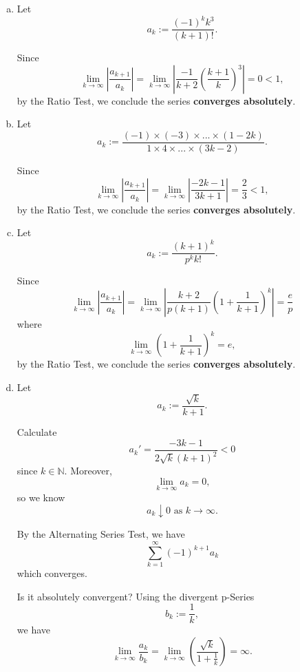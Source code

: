 \begin{Exercise}
\begin{enumerate}[a)]
\item
\begin{solution}
Let 
$$
a_k := \frac{(-1)^k k^3}{(k+1)!}.
$$

Since 
$$
\lim_{k\to\infty}\left|\frac{a_{k+1}}{a_k}\right| 
= \lim_{k\to\infty}\left|\frac{-1}{k+2}\left(\frac{k+1}{k}\right)^3\right| 
= 0 
< 1,
$$ by the Ratio Test, we conclude the series \textbf{converges absolutely}.
\end{solution}

\item
\begin{solution}
Let 
$$a_k := \frac{(-1)\times(-3)\times...\times(1-2k)}{1 \times 4 \times ... \times (3k-2)}.
$$

Since 
$$
\lim_{k\to\infty}\left|\frac{a_{k+1}}{a_k}\right| 
= \lim_{k\to\infty}\left|\frac{-2k-1}{3k+1}\right| 
= \frac{2}{3} 
< 1,
$$ by the Ratio Test, we conclude the series \textbf{converges absolutely}.
\end{solution}

\item
\begin{solution}
Let 
$$
a_k := \frac{\left( k+1 \right)^k}{p^k k!}.
$$

Since 
$$
\lim_{k\to\infty}\left|\frac{a_{k+1}}{a_k}\right| 
= \lim_{k\to\infty}\left|\frac{k+2}{p\left(k+1\right)}\left(1+\frac{1}{k+1}\right)^k\right| 
= \frac{e}{p}
$$ 
where 
$$
\lim_{k\to\infty}\left(1+\frac{1}{k+1}\right)^k = e,
$$
by the Ratio Test, we conclude the series \textbf{converges absolutely}.
\end{solution}

\item
\begin{solution}
Let
$$
a_k := \frac{\sqrt{k}}{k+1}.
$$

Calculate 
$$
a_k' = \frac{-3k-1}{2\sqrt{k}\left(k+1\right)^2} < 0
$$ 
since $k\in\mathbb{N}$. Moreover, 
$$
\lim_{k\to\infty}a_k = 0,
$$ 
so we know 
$$
a_k\downarrow 0\text{ as }k\to\infty.
$$ 

By the Alternating Series Test, we have 
$$
\sum_{k=1}^{\infty}\left(-1\right)^{k+1}a_k
$$ 
which converges.

Is it absolutely convergent? Using the divergent p-Series
$$
b_k := \frac{1}{k},
$$ 
we have 
$$
\lim_{k\to\infty}\frac{a_k}{b_k}
= \lim_{k\to\infty}\left(\frac{\sqrt{k}}{1+\frac{1}{k}}\right) 
= \infty.
$$ 


\end{solution}
\end{enumerate}
\end{Exercise}
